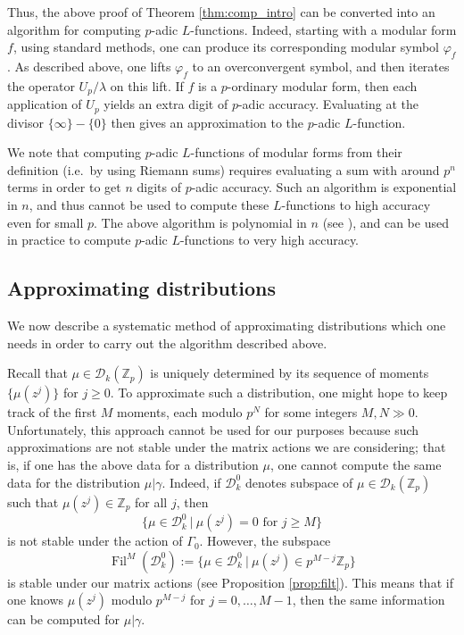 \documentclass{amsart}
\theoremstyle{plain}
\theoremstyle{definition}
\newcommand{\D}{{\mathcal D}}
\newcommand{\Z}{{\mathbb Z}}
\newcommand{\Zp}{\Z_p}
\newcommand{\Dvla}[1]{\D_{#1}(\Zp)}
\newcommand{\Dkla}{\Dvla{k}}
\newcommand{\Dk}{\D_{k}}
\DeclareMathOperator{\Fil}{Fil}
\begin{document}
Thus, the above proof of Theorem \ref{thm:comp_intro} can be converted into an algorithm for computing $p$-adic $L$-functions.
Indeed, starting with a modular form $f$, using standard methods, one can produce its corresponding modular symbol $\varphi_f$.  As described above, one lifts $\varphi_f$ to an overconvergent symbol, and then iterates the operator $U_p/\lambda$ on this lift.  If $f$ is a $p$-ordinary modular form, then each application of $U_p$ yields an extra digit of $p$-adic accuracy.  Evaluating at the divisor $\{ \infty \} - \{ 0 \}$ then gives an approximation to the $p$-adic $L$-function.

We note that computing $p$-adic $L$-functions of modular forms from their definition (i.e.\ by using Riemann sums) requires evaluating a sum with around $p^n$ terms in order to get $n$ digits of $p$-adic accuracy.  Such an algorithm is exponential in $n$, and thus cannot be used to compute these $L$-functions to high accuracy even for small $p$.  The above algorithm is polynomial in $n$ (see \cite[Proposition 2.14]{DP}), and can be used in practice to compute $p$-adic $L$-functions to very high accuracy.

\subsection{Approximating distributions}

We now describe a systematic method of approximating distributions which one needs in order to carry out the algorithm described above.

Recall that $\mu \in \Dkla$ is uniquely determined by its sequence of moments $\{ \mu(z^j) \}$ for $j \geq 0$.  To approximate such a distribution, one might hope to keep track of the first $M$ moments, each modulo $p^N$ for some integers $M,N \gg 0$.  Unfortunately, this approach cannot be used for our purposes because such approximations are not stable under the matrix actions we are considering; that is, if one has the above data for a distribution $\mu$, one cannot compute the same data for the distribution $\mu \big| \gamma$.   Indeed, if $\Dk^0$ denotes subspace of $\mu \in \Dkla$ such that $\mu(z^j) \in \Zp$ for all $j$, then 
$$
\{ \mu \in \Dk^0 ~|~ \mu(z^j)=0 \text{~for~} j \geq M\}
$$
is not stable under the action of $\Gamma_0$.  However,  the subspace
$$
\Fil^M(\Dk^0) := \{ \mu \in \Dk^0 ~|~ \mu(z^j) \in p^{M-j} \Zp\}  
$$
is stable under our matrix actions (see Proposition \ref{prop:filt}).  This means that if one knows $\mu(z^j)$ modulo $p^{M-j}$ for $j=0, \dots,M-1$, then the same information can be computed for $\mu \big| \gamma$.  
\end{document}
